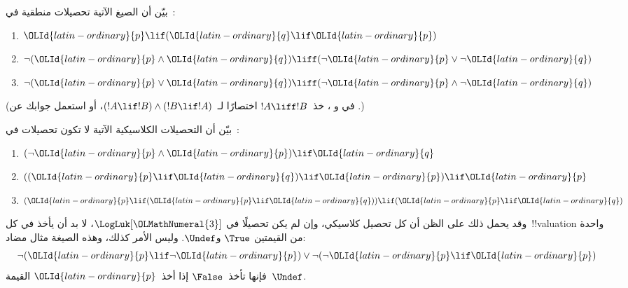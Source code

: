 \documentclass[../../../include/open-logic-section]{subfiles}
\begin{document}
\begin{prob}
  بيّن أن الصيغ الآتية تحصيلات منطقية في~\LogLuk[\OLClassicalDigits{3}]:
  \begin{enumerate}
    \item $\OLId{latin-ordinary}{p} \lif (\OLId{latin-ordinary}{q} \lif \OLId{latin-ordinary}{p})$
    \item\label{mvl:thr:luk:prob:luk-taut-2} $\lnot(\OLId{latin-ordinary}{p} \land \OLId{latin-ordinary}{q}) \liff (\lnot \OLId{latin-ordinary}{p} \lor \lnot \OLId{latin-ordinary}{q})$
    \item\label{mvl:thr:luk:prob:luk-taut-3} $\lnot(\OLId{latin-ordinary}{p} \lor \OLId{latin-ordinary}{q}) \liff (\lnot \OLId{latin-ordinary}{p} \land \lnot \OLId{latin-ordinary}{q})$
  \end{enumerate}
  (في  و
  ، خذ~$!A \liff !B$
  اختصارًا لـ~$(!A \lif !B) \land (!B \lif !A)$، أو استعمل جوابك
  عن .)
\end{prob}

\begin{prob}
  بيّن أن التحصيلات الكلاسيكية الآتية لا تكون تحصيلات في~\LogLuk[\OLClassicalDigits{3}]:
  \begin{enumerate}
    \item $(\lnot \OLId{latin-ordinary}{p} \land \OLId{latin-ordinary}{p}) \lif \OLId{latin-ordinary}{q}$
    \item $((\OLId{latin-ordinary}{p} \lif \OLId{latin-ordinary}{q}) \lif \OLId{latin-ordinary}{p}) \lif \OLId{latin-ordinary}{p}$
    \item $(\OLId{latin-ordinary}{p} \lif (\OLId{latin-ordinary}{p} \lif \OLId{latin-ordinary}{q})) \lif (\OLId{latin-ordinary}{p} \lif \OLId{latin-ordinary}{q})$
  \end{enumerate}
\end{prob}

وقد يحمل ذلك على الظن أن كل تحصيل كلاسيكي، وإن لم يكن تحصيلًا في
$\LogLuk[\OLMathNumeral{3}]$، لا بد أن يأخذ في كل~!!{valuation} واحدة من القيمتين
$\True$ و$\Undef$. وليس الأمر كذلك، وهذه الصيغة مثال مضاد:
\[
  \lnot(\OLId{latin-ordinary}{p} \lif \lnot \OLId{latin-ordinary}{p}) \lor \lnot(\lnot \OLId{latin-ordinary}{p} \lif \OLId{latin-ordinary}{p})
\]
فإنها تأخذ~$\False$ إذا أخذ~$\OLId{latin-ordinary}{p}$ القيمة~$\Undef$.
\end{document}
